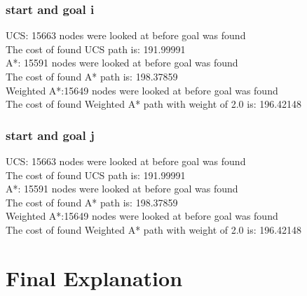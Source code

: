 \documentclass[11pt]{article} %
\begin{document}
\subsubsection{start and goal i}
UCS: 15663 nodes were looked at before goal was found\\
The cost of found UCS path is: 191.99991\\
A*: 15591 nodes were looked at before goal was found\\
The cost of found A* path is: 198.37859\\
Weighted A*:15649 nodes were looked at before goal was found\\
The cost of found Weighted A* path with weight of 2.0 is: 196.42148
\subsubsection{start and goal j}
UCS: 15663 nodes were looked at before goal was found\\
The cost of found UCS path is: 191.99991\\
A*: 15591 nodes were looked at before goal was found\\
The cost of found A* path is: 198.37859\\
Weighted A*:15649 nodes were looked at before goal was found\\
The cost of found Weighted A* path with weight of 2.0 is: 196.42148

\section{Final Explanation}
\end{document}
